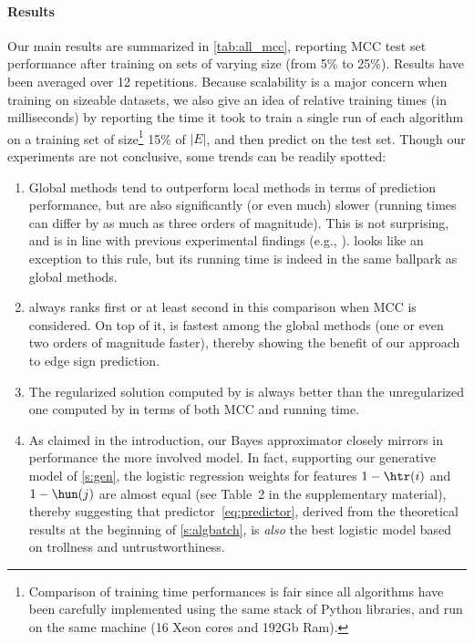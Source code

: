 \paragraph{Results}
Our main results are summarized in \autoref{tab:all_mcc}, reporting MCC test set performance after
training on sets of varying size (from 5\% to 25\%). Results have been averaged over 12 repetitions.
Because scalability is a major concern when training on sizeable datasets, we also give an idea of
relative training times (in milliseconds) by reporting the time it took to train a single run of
each algorithm on a training set of size\footnote{Comparison of training time performances is fair
since all algorithms have been carefully implemented using the same stack of Python libraries, and
run on the same machine (16 Xeon cores and 192Gb Ram).} 15\% of $|E|$, and then predict on the test
set. Though our experiments are not conclusive, some trends can be readily spotted:

\begin{enumerate}[leftmargin=2em,label=\textbf{\arabic*.}]

  \item Global methods tend to outperform local methods in terms of prediction performance, but are
    also significantly (or even much) slower (running times can differ by as much as three orders of
    magnitude). This is not surprising, and is in line with previous experimental findings (e.g.,
    \autocites{shahriari2014ranking}{wu2016troll}). \compbayesian{} looks like an exception to this
    rule, but its running time is indeed in the same ballpark as global methods.

  \item \uslpropGsec{} always ranks first or at least second in this comparison when MCC is
    considered. On top of it, \uslpropGsec{} is fastest among the global methods (one or even two
    orders of magnitude faster), thereby showing the benefit of our approach to edge sign
    prediction.

  \item The regularized solution computed by \uslpropGsec{} is always better than the unregularized
    one computed by \qoptim{} in terms of both MCC and running time.

  \item As claimed in the introduction, our Bayes approximator \usrule{} closely mirrors in
    performance the more involved \uslogregp{} model. In fact, supporting our generative model of
    \autoref{s:gen}, the logistic regression weights for features $1-\htr(i)$ and $1-\hun(j)$
    are almost equal (see Table~2 in the supplementary material), thereby suggesting that
    predictor~\eqref{eq:predictor}, derived from the theoretical results at the beginning of
    \autoref{s:algbatch}, is \emph{also} the best logistic model based on trollness and
    untrustworthiness.
\end{enumerate}
